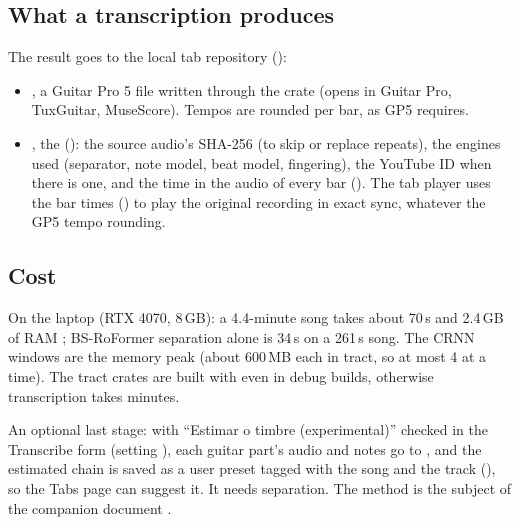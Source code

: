 \subsection{What a transcription produces}

The result goes to the local tab repository
():
\begin{itemize}
\item {}, a Guitar Pro 5 file written through the
   crate (opens in Guitar Pro, TuxGuitar, MuseScore). Tempos are
  rounded per bar, as GP5 requires.
\item {}, the  ():
  the source audio's SHA-256 (to skip or replace repeats), the engines used
  (separator, note model, beat model, fingering), the YouTube ID when there is
  one, and the time in the audio of every bar (). The tab
  player uses the bar times () to play the original
  recording in exact sync, whatever the GP5 tempo rounding.
\end{itemize}

\subsection{Cost}

On the laptop (RTX 4070, 8\,GB): a 4.4-minute song takes about 70\,s and
2.4\,GB of RAM \measured; BS-RoFormer separation alone is 34\,s on a 261\,s
song. The CRNN windows are the memory peak (about 600\,MB each in tract, so at
most 4 at a time). The tract crates are built with  even in
debug builds, otherwise transcription takes minutes.

\begin{inapp}
An optional last stage: with
``Estimar o timbre (experimental)'' checked in the Transcribe form (setting
), each guitar part's audio and notes go
to , and the estimated chain is saved as
a user preset tagged with the song and the track (), so
the Tabs page can suggest it. It needs separation. The method is the subject of
the companion document .
\end{inapp}

